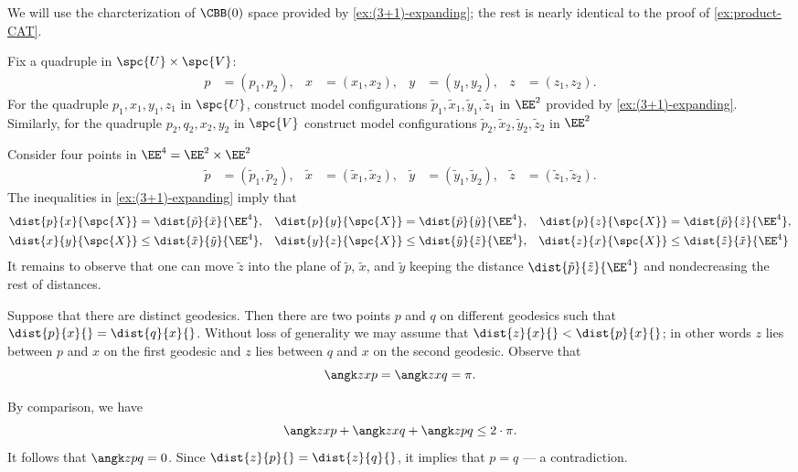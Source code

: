 We will use the charcterization of $\CBB(0)$ space provided by \ref{ex:(3+1)-expanding}; the rest is nearly identical to the proof of \ref{ex:product-CAT}.

Fix a quadruple in $\spc{U}\times \spc{V}$:
\begin{align*}
p&=(p_1,p_2),
&
x&=(x_1,x_2),
&
y&=(y_1,y_2),
&
z&=(z_1,z_2).
\end{align*}
For the quadruple $p_1,x_1,y_1,z_1$ in $\spc{U}$,
construct model configurations  $\tilde p_1,\tilde x_1,\tilde y_1,\tilde z_1$ in $\EE^2$ provided by \ref{ex:(3+1)-expanding}.  
Similarly, for the quadruple $p_2,q_2,x_2,y_2$ in $\spc{V}$
construct model configurations  $\tilde p_2,\tilde x_2,\tilde y_2,\tilde z_2$ in $\EE^2$

Consider four points in $\EE^4=\EE^2\times\EE^2$ 
\begin{align*}
\tilde p&=(\tilde p_1,\tilde p_2),
&
\tilde x&=(\tilde x_1,\tilde x_2),
&
\tilde y&=(\tilde y_1,\tilde y_2),
&
\tilde z&=(\tilde z_1,\tilde z_2).
\end{align*}
The inequalities in  \ref{ex:(3+1)-expanding} imply that
\begin{align*}
\dist{p}{x}{\spc{X}}&=\dist{\tilde p}{\tilde x}{\EE^4},
&
\dist{p}{y}{\spc{X}}&=\dist{\tilde p}{\tilde y}{\EE^4},
&
\dist{p}{z}{\spc{X}}&=\dist{\tilde p}{\tilde z}{\EE^4},
\\
\dist{x}{y}{\spc{X}}&\le\dist{\tilde x}{\tilde y}{\EE^4},
&
\dist{y}{z}{\spc{X}}&\le\dist{\tilde y}{\tilde z}{\EE^4},
&
\dist{z}{x}{\spc{X}}&\le\dist{\tilde z}{\tilde x}{\EE^4}
\end{align*}
It remains to observe that one can move $\tilde z$ into the plane of $\tilde p$, $\tilde x$, and $\tilde y$ keeping the distance $\dist{\tilde p}{\tilde z}{\EE^4}$ and nondecreasing the rest of distances. 

Suppose that there are distinct geodesics.
Then there are two points $p$ and $q$ on different geodesics such that $\dist{p}{x}{}=\dist{q}{x}{}$.
Without loss of generality we may assume that $\dist{z}{x}{}<\dist{p}{x}{}$;
in other words $z$ lies between $p$ and $x$ on the first geodesic and 
$z$ lies between $q$ and $x$ on the second geodesic.
Observe that 
\[\angk zxp=\angk zxq=\pi.\]

By comparison, we have
\[\angk zxp+\angk zxq+\angk zpq\le2\cdot\pi.\]
It follows that $\angk zpq=0$.
Since $\dist{z}{p}{}=\dist{z}{q}{}$, it implies that $p=q$ --- a contradiction.

